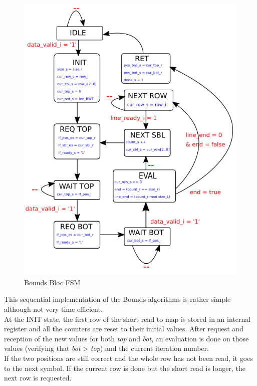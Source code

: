 \begin{minipage}[t]{0.45\textwidth}
\begin{figure}[H]
    \centering
    \hspace*{-20mm}\includegraphics[scale = 0.5]{Figures/BOUNDS_FSM.png}
    \caption{Bounds Bloc FSM}
    \label{fig:bounds_fsm}
\end{figure}
\end{minipage}
\hfill
\begin{minipage}[t]{0.4\textwidth}
This sequential implementation of the Bounds algorithms is rather simple although not very time efficient. \\

At the INIT state, the first row of the short read to map is stored in an internal register and all the counters are reset to their initial values. After request and reception of the new values for both \textit{top} and \textit{bot}, an evaluation is done on those values (verifying that \textit{bot} > \textit{top}) and the current iteration number. \\
If the two positions are still correct and the whole row has not been read, it goes to the next symbol. If the current row is done but the short read is longer, the next row is requested.
\end{minipage}
\vspace*{8mm}


